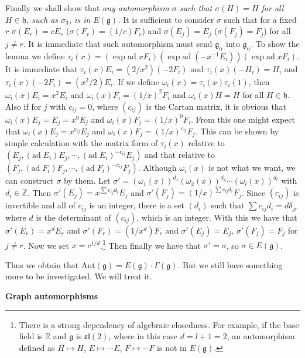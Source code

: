 \documentclass{article}
\newcommand{\InZ}{\mathbb{Z}}
\newcommand{\ReR}{\mathbb{R}}
\newcommand{\lie}[1]{\mathfrak{#1}}
\newcommand{\ad}[1]{\mathrm{ad}\; #1}
\begin{document}
Finally we shall show that \textit{any automorphism $\sigma$ such that $\sigma(H) = H$ for all $H \in \lie{h}$, such as $\sigma_3$, is in $E(\lie{g})$.}
It is sufficient to consider $\sigma$ such that for a fixed $r$ $\sigma(E_r) = cE_r$ ($\sigma(F_r) = (1/c)F_r$) and $\sigma(E_j) = E_j$ ($\sigma(F_j) = F_j$) for all $j \ne r$.
It is immediate that such automorphism must send $\lie{g}_\alpha$ into $\lie{g}_\alpha$.
To show the lemma we define $\tau_i(x) = (\exp{\ad{xF_i}}) (\exp{\ad{(-x^{-1} E_i)}}) (\exp{\ad{xF_i}})$.
It is immediate that $\tau_i(x)E_i = (2/x^2)(-2F_i)$ and $\tau_i(x)(-H_i) = H_i$ and $\tau_i(x)(-2F_i) = (x^2/2) E_i$.
If we define $\omega_i(x) = \tau_i(x) \tau_i(1)$, then $\omega_i(x)E_i = x^2 E_i$ and $\omega_i(x)F_i = (1/x)^2 F_i$ and $\omega_i(x)H = H$ for all $H \in \lie{h}$.
Also if for $j$ with $c_{ij} = 0$, where $(c_{ij})$ is the Cartan matrix, it is obvious that $\omega_i(x)E_j = E_j = x^0 E_j$ and $\omega_i(x)F_j = (1/x)^0 F_i$.
From this one might expect that $\omega_i(x)E_j = x^{c_{ij}} E_j$ and $\omega_i(x)F_j = (1/x)^{c_{ij}} F_j$.
This can be shown by simple calculation with the matrix form of $\tau_i(x)$ relative to $(E_j, (\ad{E_i})E_j, \cdots, (\ad{E_i})^{-c_{ij}} E_j)$ and that relative to $(F_j, (\ad{F_i})F_j, \cdots, (\ad{F_i})^{-c_{ij}} F_j)$.
Although $\omega_i(x)$ is not what we want, we can construct $\sigma$ by them.
Let $\sigma' = (\omega_1(x))^{d_1} (\omega_2(x))^{d_2} \cdots (\omega_l(x))^{d_l}$ with $d_i \in \InZ$.
Then $\sigma'(E_j) = x^{\sum c_{ij} d_i} E_j$ and $\sigma'(F_j) = (1/x)^{\sum c_{ij} d_i} F_j$.
Since $(c_{ij})$ is invertible and all of $c_{ij}$ is an integer, there is a set $(d_i)$ such that $\sum c_{ij} d_i = d \delta_{jr}$ where $d$ is the determinant of $(c_{ij})$, which is an integer.
With this we have that $\sigma'(E_r) = x^d E_r$ and $\sigma'(F_r) = (1/x^d) F_r$ and $\sigma'(E_j) = E_j$, $\sigma'(F_j) = F_j$ for $j \ne r$.
Now we set $x = c^{1/d}$.\footnote{There is a strong dependency of algebraic closedness.
For example, if the base field is $\ReR$ and $\lie{g}$ is $\lie{sl}(2)$, where in this case $d = l + 1 = 2$, an automorphism defined as $H \mapsto H$, $E \mapsto -E$, $F \mapsto -F$ is not in $E(\lie{g})$.}
Then finally we have that $\sigma' = \sigma$, so $\sigma \in E(\lie{g})$.

Thus we obtain that $\textrm{Aut}(\lie{g}) = E(\lie{g}) \cdot \Gamma(\lie{g})$.
But we still have something more to be investigated.
We will treat it.

\newpage

\textbf{Graph automorphisms}
\end{document}
